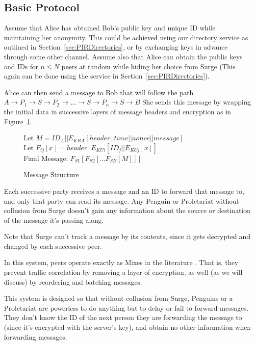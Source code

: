 \documentclass[twocolumn,11pt,english]{article}
\begin{document}
\subsection{Basic Protocol}
\label{sec:basic}
Assume that Alice has obtained Bob's public key and unique ID while maintaining her anonymity. This could be achieved using our directory service as outlined in Section~\ref{sec:PIRDirectories}, or by exchanging keys in advance through some other channel. Assume also that Alice can obtain the public keys and IDs for $n \le N$ peers at random while hiding her choice from Surge (This again can be done using the service in Section~\ref{sec:PIRDirectories}).

Alice can then send a message to Bob that will follow the path 
\\$A \rightarrow P_1 \rightarrow S \rightarrow P_2 \rightarrow ... \rightarrow S \rightarrow P_n \rightarrow S \rightarrow B$ 
She sends this message by wrapping the initial data in successive layers of message headers and encryption as in Figure~\ref{messageStructure}.
\\
\begin{figure}[h]
Let \scriptsize$M = ID_A||E_{KRA}[ header || time || nonce || message ]$
\normalsize
\\Let \scriptsize$F_{ij}[x] = header||E_{KUi}[ ID_j || E_{KUj}[ x ] ]$
\normalsize
\\
Final Message: $F_{S1}[F_{S2}[...F_{SB}[ M ]]]$
\caption{Message Structure}
\label{messageStructure}
\end{figure}

Each successive party receives a message and an ID to forward that message to, and only that party can read its message. Any Penguin or Proletariat without collusion from Surge doesn't gain any information about the source or destination of the message it's passing along. 

Note that Surge can't track a message by its contents, since it gets decrypted and changed by each successive peer. 

In this system, peers operate exactly as Mixes in the literature \cite{chaum-mix} . That is, they prevent traffic correlation by removing a layer of encryption, as well (as we will discuss) by reordering and batching messages. 

This system is designed so that without collusion from Surge, Penguins or a Proletariat are powerless to do anything but to delay or fail to forward messages. They don't know the ID of the next person they are forwarding the message to (since it's encrypted with the server's key), and obtain no other information when forwarding messages. 
\end{document}
